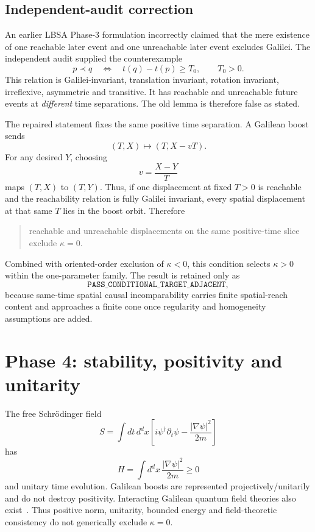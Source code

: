 \documentclass[11pt,a4paper]{article}
\newcommand{\kap}{\kappa}
\newcommand{\status}[1]{\texttt{#1}}
\begin{document}
\subsection{Independent-audit correction}
An earlier LBSA Phase-3 formulation incorrectly claimed that the mere existence of one reachable later event and one unreachable later event excludes Galilei.  The independent audit supplied the counterexample
\begin{equation}
p\prec q\quad\Longleftrightarrow\quad t(q)-t(p)\ge T_0,
\qquad T_0>0.
\label{eq:threshold}
\end{equation}
This relation is Galilei-invariant, translation invariant, rotation invariant, irreflexive, asymmetric and transitive.  It has reachable and unreachable future events at \emph{different} time separations.  The old lemma is therefore false as stated.

The repaired statement fixes the same positive time separation.  A Galilean boost sends
\[
(T,X)\mapsto(T,X-vT).
\]
For any desired $Y$, choosing
\[
v=\frac{X-Y}{T}
\]
maps $(T,X)$ to $(T,Y)$.  Thus, if one displacement at fixed $T>0$ is reachable and the reachability relation is fully Galilei invariant, every spatial displacement at that same $T$ lies in the boost orbit.  Therefore
\begin{quote}
reachable and unreachable displacements on the same positive-time slice exclude $\kap=0$.
\end{quote}
Combined with oriented-order exclusion of $\kap<0$, this condition selects $\kap>0$ within the one-parameter family.  The result is retained only as
\[
\status{PASS\_CONDITIONAL\_TARGET\_ADJACENT},
\]
because same-time spatial causal incomparability carries finite spatial-reach content and approaches a finite cone once regularity and homogeneity assumptions are added.

\section{Phase 4: stability, positivity and unitarity}
The free Schr\"odinger field
\[
S=\int dt\,d^dx\left[i\psi^\dagger\partial_t\psi-\frac{|\nabla\psi|^2}{2m}\right]
\]
has
\[
H=\int d^dx\,\frac{|\nabla\psi|^2}{2m}\ge0
\]
and unitary time evolution.  Galilean boosts are represented projectively/unitarily and do not destroy positivity.  Interacting Galilean quantum field theories also exist~\cite{levyleblond1967}.  Thus positive norm, unitarity, bounded energy and field-theoretic consistency do not generically exclude $\kap=0$.
\end{document}

